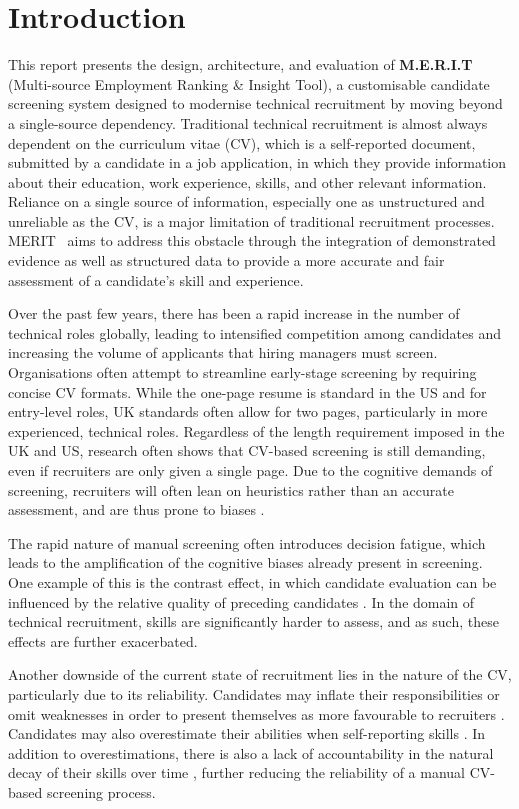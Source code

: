 \chapter{Introduction}

This report presents the design, architecture, and evaluation of \textbf{M.E.R.I.T} (Multi-source Employment Ranking \& Insight Tool),
a customisable candidate screening system designed to modernise technical recruitment by moving beyond a single-source dependency.
Traditional technical recruitment is almost always dependent on the curriculum vitae (CV), which is a self-reported document, submitted by a 
candidate in a job application, in which they provide information about their education, work experience, skills, and other relevant information.
Reliance on a single source of information, especially one as unstructured and unreliable as the CV, is a major limitation of traditional
recruitment processes. MERIT~\cite{merit_repo} aims to address this obstacle through the integration of demonstrated evidence as well as structured data 
to provide a more accurate and fair assessment of a candidate's skill and experience.

Over the past few years, there has been a rapid increase in the number of technical roles globally, leading to intensified competition
among candidates and increasing the volume of applicants that hiring managers must screen. Organisations often attempt to streamline
early-stage screening by requiring concise CV formats. While the one-page resume is standard in the US and for entry-level roles,
UK standards often allow for two pages, particularly in more experienced, technical roles. Regardless of the length requirement imposed 
in the UK and US, research often shows that CV-based screening is still demanding, even if recruiters are only given a single page. 
Due to the cognitive demands of screening, recruiters will often lean on heuristics rather than an accurate assessment, and are 
thus prone to biases \cite{moore2023, tversky1974}.

The rapid nature of manual screening often introduces decision fatigue, which leads to the amplification of the cognitive biases already
present in screening. One example of this is the contrast effect, in which candidate evaluation can be influenced
by the relative quality of preceding candidates \cite{palmer2014}. In the domain of technical recruitment, skills are significantly
harder to assess, and as such, these effects are further exacerbated.

Another downside of the current state of recruitment lies in the nature of the CV, particularly due to its reliability. Candidates
may inflate their responsibilities or omit weaknesses in order to present themselves as more favourable to recruiters
\cite{henle2019_resume_fraud,dunning2004}. Candidates may also overestimate their abilities when self-reporting skills \cite{dunning2004}. 
In addition to overestimations, there is also a lack of accountability in the natural decay of their skills over time \cite{arthur1998}, 
further reducing the reliability of a manual CV-based screening process.


